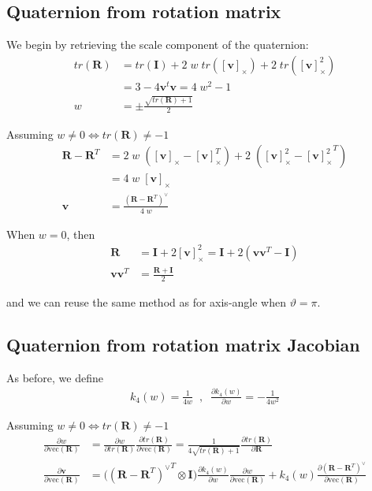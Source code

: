 \documentclass{article}
\renewcommand\t{\vartheta}
\newcommand\R{\bm{R}}
\newcommand\I{\bm{I}}
\renewcommand\v{\bm{v}}
\renewcommand\skew[1]{[#1]_{\times}}
\newcommand\vecop[1]{\text{vec} \left( #1\right)}
\begin{document}
\subsection{Quaternion from rotation matrix}
We begin by retrieving the scale component of the quaternion:
\begin{align}
  tr(\R) 
    &= tr(\I) + 2\; w \; tr(\skew{\v}) + 2 \; tr(\skew{\v}^2) \\
    &= 3 - 4 \v^t \v = 4\;w^2 - 1 \\
  w &= \pm \frac{ \sqrt{ tr(\R) + 1} }{2}
\end{align}

Assuming $w \neq 0 \iff tr(\R) \neq -1$
\begin{align}
  \R - \R^T
    &= 2\; w \; \left( \skew{\v} - \skew{\v}^T \right) + 2 \; \left(\skew{\v}^2 - {\skew{\v}^2}^T \right) \\
    &= 4\; w \; \skew{\v} \\
  \v &= \frac{\left( \R -\R^T \right)^\vee}{4\;w}
\end{align}

When $w = 0$, then
\begin{align}
  \R &= \I + 2 \skew{\v}^2  = \I + 2 \left ( \v \v^T - \I \right) \\
  \v \v^T &= \frac{\R + \I}{2}
\end{align}

and we can reuse the same method as for axis-angle when $\t = \pi$.

\subsection{Quaternion from rotation matrix Jacobian}
As before, we define
\begin{align}
  k_4(w) = \frac{1}{4w} \;\;,\;\; \frac{\partial k_4(w)}{\partial w} = -\frac{1}{4w^2}
\end{align}

Assuming $w \neq 0 \iff tr(\R) \neq -1$
\begin{align}
  \frac{\partial w}{\partial \vecop{\R}}
    &=\frac{\partial w}{\partial tr(\R)} \frac{\partial tr(\R)}{\partial \vecop{\R}}
    = \frac{1}{4\sqrt{tr(\R) + 1}} \frac{\partial tr(\R)}{\partial \R} \\
  \frac{\partial \v}{\partial \vecop{\R}}
    &= \big({\left(\R - \R^T\right)^\vee}^T \otimes \I \big)\frac{\partial k_4(w)}{\partial w}\frac{\partial w}{\partial \vecop{\R}}
    + k_4(w) \frac{\partial \left(\R - \R^T\right)^\vee }{\partial \vecop{\R}}
\end{align}
\end{document}
